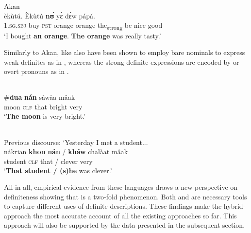 \documentclass[output=paper,
modfonts
]{langscibook}
\begin{document}
\begin{exe}
	\ex \label{ex:sereikaite:24}
	Akan \\
	 {èkùtú}. {Èkùtú} {\textbf{n\'{ʊ}}} {y\`{ɛ}} {d\`{ɛ}w}  {pápá}.\\
	\textsc{1.sg.sbj}-buy-\textsc{pst} orange orange the\textsubscript{strong} be nice good\\
	\trans `I bought \textbf{an orange}. \textbf{The orange} was really tasty.' \citep[2]{ArkohMatthewson2013} \\
\end{exe}

Similarly to Akan,  like  also have been shown to employ bare nominals to express weak definites as in , whereas the strong definite expressions are encoded by  or overt pronouns as in  \citep{Jenks2015}.


\begin{exe}
	\ex \label{ex:sereikaite:25} 
	 \\
	  {\op}\#\textbf{dua\ng} \textbf{n\'an}{\cp}   {s\`aw\`aa\ng} {m\^aak}\\
	moon  {\phantom{(\#}\textsc{clf}} {that} bright very\\
	\trans `\textbf{The moon} is very bright.' \citep[106]{Jenks2015}
\end{exe} 

\begin{exe}
	\ex \label{ex:sereikaite:26}
	 \\
	Previous discourse: `Yesterday I met a student...\\
	\gll {\op}nákrian{\cp}  \textbf{khon} \textbf{nán} \textnormal{/} {\op}{\textbf{kháw}}{\cp} {chalàat} {m\^aak}\\
	\phantom{(}student {\textsc{clf}} {that} /  clever very\\
	\trans `\textbf{That student / (s)he} was clever.' \citep[112]{Jenks2015}
\end{exe}

All in all, empirical evidence from these languages draws a new perspective on definiteness showing that  is a two-fold phenomenon. Both  and  are necessary tools to capture different uses of definite descriptions. These findings make the hybrid-approach the most accurate account of all the existing approaches so far. This approach will also be supported by the  data presented in the subsequent section. 
\end{document}
